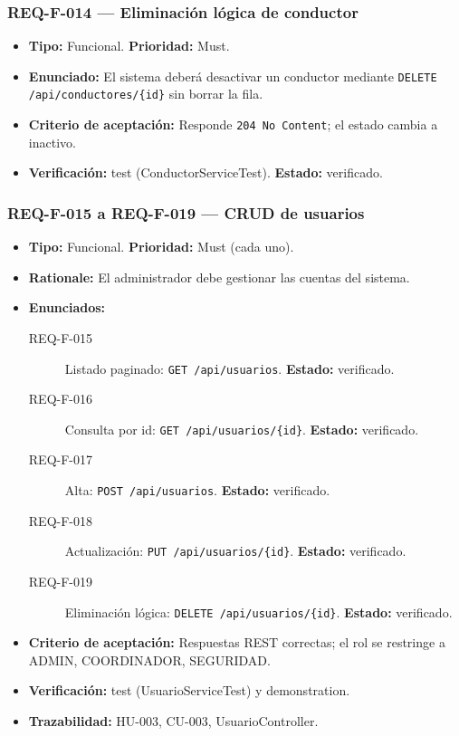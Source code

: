 \documentclass[12pt,a4paper]{article}
\begin{document}
\subsubsection{REQ-F-014 --- Eliminación lógica de conductor}
\begin{itemize}
  \item \textbf{Tipo:} Funcional. \textbf{Prioridad:} Must.
  \item \textbf{Enunciado:} El sistema deberá desactivar un conductor mediante \texttt{DELETE /api/conductores/\{id\}} sin borrar la fila.
  \item \textbf{Criterio de aceptación:} Responde \texttt{204 No Content}; el estado cambia a inactivo.
  \item \textbf{Verificación:} test (ConductorServiceTest). \textbf{Estado:} verificado.
\end{itemize}

\subsubsection{REQ-F-015 a REQ-F-019 --- CRUD de usuarios}
\begin{itemize}
  \item \textbf{Tipo:} Funcional. \textbf{Prioridad:} Must (cada uno).
  \item \textbf{Rationale:} El administrador debe gestionar las cuentas del sistema.
  \item \textbf{Enunciados:}
    \begin{description}
      \item[REQ-F-015] Listado paginado: \texttt{GET /api/usuarios}. \textbf{Estado:} verificado.
      \item[REQ-F-016] Consulta por id: \texttt{GET /api/usuarios/\{id\}}. \textbf{Estado:} verificado.
      \item[REQ-F-017] Alta: \texttt{POST /api/usuarios}. \textbf{Estado:} verificado.
      \item[REQ-F-018] Actualización: \texttt{PUT /api/usuarios/\{id\}}. \textbf{Estado:} verificado.
      \item[REQ-F-019] Eliminación lógica: \texttt{DELETE /api/usuarios/\{id\}}. \textbf{Estado:} verificado.
    \end{description}
  \item \textbf{Criterio de aceptación:} Respuestas REST correctas; el rol se restringe a ADMIN, COORDINADOR, SEGURIDAD.
  \item \textbf{Verificación:} test (UsuarioServiceTest) y demonstration.
  \item \textbf{Trazabilidad:} HU-003, CU-003, UsuarioController.
\end{itemize}
\end{document}

